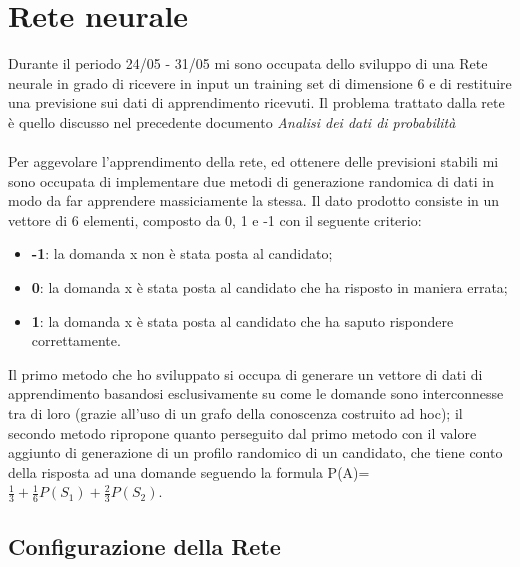 \documentclass[10pt,a4paper]{article}
\begin{document}
\section{Rete neurale}
\label{Rete neurale}

Durante il periodo 24/05 - 31/05 mi sono occupata dello sviluppo di una Rete neurale in grado di ricevere in input un training set di dimensione 6 e di restituire una previsione sui dati di apprendimento ricevuti.
\noindent
Il problema trattato dalla rete \`e quello discusso nel precedente documento \textit{Analisi dei dati di probabilit\`a}
\\\\
Per aggevolare l'apprendimento della rete, ed ottenere delle previsioni stabili mi sono occupata di implementare due metodi di generazione randomica di dati in modo da far apprendere massiciamente la stessa.
Il dato prodotto consiste in un vettore di 6 elementi, composto da 0, 1 e -1 con il seguente criterio:
\begin{itemize}
\item \textbf{-1}: la domanda x non \`e stata posta al candidato;
\item \textbf{0}: la domanda x \`e stata posta al candidato che ha risposto in maniera errata;
\item \textbf{1}: la domanda x \`e stata posta al candidato che ha saputo rispondere correttamente.
\end{itemize}
\noindent
Il primo metodo che ho sviluppato si occupa di generare un vettore di dati di apprendimento basandosi esclusivamente su come le domande sono interconnesse tra di loro (grazie all'uso di un grafo della conoscenza costruito ad hoc); il secondo metodo ripropone quanto perseguito dal primo metodo con il valore aggiunto di generazione di un profilo randomico di un candidato, che tiene conto della risposta ad una domande seguendo la formula P(A)= $\frac{1}{3}+\frac{1}{6}P(S_1)+\frac{2}{3}P(S_2)$.

\subsection{Configurazione della Rete}
\label{Configurazione della Rete}
\end{document}
